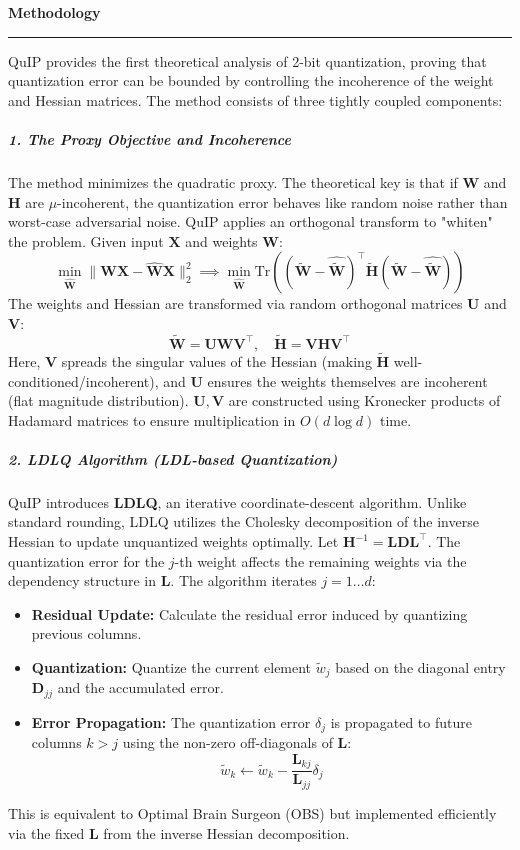 \documentclass[11pt,a4paper]{article}
\newcommand{\problemp}[1]{%
  \par\medskip
  {\noindent\bfseries\normalsize\color{signcol}#1\par}%
  \vspace{0.4ex}%
  {\noindent\color{softgray}\rule{\linewidth}{0.6pt}\par}%
  \vspace{0.8ex}%
}
\theoremstyle{definition}
\begin{document}
\vspace{1cm}
\problemp{Methodology}
QuIP provides the first theoretical analysis of 2-bit quantization, proving that quantization error can be bounded by controlling the incoherence of the weight and Hessian matrices. The method consists of three tightly coupled components:

\subparagraph{1. The Proxy Objective and Incoherence}
The method minimizes the quadratic proxy. The theoretical key is that if $\bm{W}$ and $\bm{H}$ are $\mu$-incoherent, the quantization error behaves like random noise rather than worst-case adversarial noise.
QuIP applies an orthogonal transform to "whiten" the problem. Given input $\bm{X}$ and weights $\bm{W}$:
\begin{equation}
  \min_{\hat{\bm{W}}} \|\bm{W}\bm{X} - \hat{\bm{W}}\bm{X}\|_2^2 \implies \min_{\hat{\bm{W}}} \text{Tr}((\tilde{\bm{W}} - \hat{\tilde{\bm{W}}})^\top \tilde{\bm{H}} (\tilde{\bm{W}} - \hat{\tilde{\bm{W}}}))
\end{equation}
The weights and Hessian are transformed via random orthogonal matrices $\bm{U}$ and $\bm{V}$:
\begin{equation}
  \tilde{\bm{W}} = \bm{U}\bm{W}\bm{V}^\top, \quad \tilde{\bm{H}} = \bm{V}\bm{H}\bm{V}^\top
\end{equation}
Here, $\bm{V}$ spreads the singular values of the Hessian (making $\tilde{\bm{H}}$ well-conditioned/incoherent), and $\bm{U}$ ensures the weights themselves are incoherent (flat magnitude distribution). $\bm{U}, \bm{V}$ are constructed using Kronecker products of Hadamard matrices to ensure multiplication in $O(d \log d)$ time.

\subparagraph{2. LDLQ Algorithm (LDL-based Quantization)}
QuIP introduces \textbf{LDLQ}, an iterative coordinate-descent algorithm. Unlike standard rounding, LDLQ utilizes the Cholesky decomposition of the inverse Hessian to update unquantized weights optimally.
Let $\bm{H}^{-1} = \bm{L}\bm{D}\bm{L}^\top$. The quantization error for the $j$-th weight affects the remaining weights via the dependency structure in $\bm{L}$. The algorithm iterates $j = 1 \dots d$:
\begin{itemize}
  \item \textbf{Residual Update:} Calculate the residual error induced by quantizing previous columns.
  \item \textbf{Quantization:} Quantize the current element $\tilde{w}_{j}$ based on the diagonal entry $\bm{D}_{jj}$ and the accumulated error.
  \item \textbf{Error Propagation:} The quantization error $\delta_j$ is propagated to future columns $k > j$ using the non-zero off-diagonals of $\bm{L}$:
    \begin{equation}
      \tilde{w}_k \leftarrow \tilde{w}_k - \frac{\bm{L}_{kj}}{\bm{L}_{jj}} \delta_j
    \end{equation}
\end{itemize}
This is equivalent to Optimal Brain Surgeon (OBS) but implemented efficiently via the fixed $\bm{L}$ from the inverse Hessian decomposition.
\end{document}
